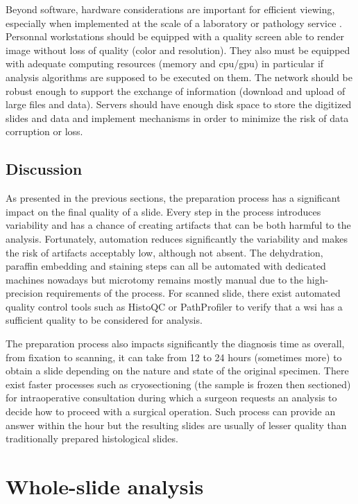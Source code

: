 Beyond software, hardware considerations are important for efficient viewing, especially when implemented at the scale of a laboratory or pathology service \cite{temprana2022digipatics}. Personnal workstations should be equipped with a quality screen able to render image without loss of quality (color and resolution). They also must be equipped with adequate computing resources (memory and \acrshort{cpu}/\acrshort{gpu}) in particular if analysis algorithms are supposed to be executed on them. The network should be robust enough to support the exchange of information (\ie download and upload of large files and data). Servers should have enough disk space to store the digitized slides and data and implement mechanisms in order to minimize the risk of data corruption or loss. 

\subsection{Discussion}

As presented in the previous sections, the preparation process has a significant impact on the final quality of a slide. Every step in the process introduces variability and has a chance of creating artifacts that can be both harmful to the analysis. Fortunately, automation reduces significantly the variability and makes the risk of artifacts acceptably low, although not absent. The dehydration, paraffin embedding and staining steps can all be automated with dedicated machines nowadays but microtomy remains mostly manual due to the high-precision requirements of the process. For scanned slide, there exist automated quality control tools such as HistoQC \cite{janowczyk2019histoqc} or PathProfiler \cite{haghighat2021pathprofiler} to verify that a \acrshort{wsi} has a sufficient quality to be considered for analysis. 

The preparation process also impacts significantly the diagnosis time as overall, from fixation to scanning, it can take from 12 to 24 hours (sometimes more) to obtain a slide depending on the nature and state of the original specimen. There exist faster processes such as cryosectioning (\ie the sample is frozen then sectioned) for intraoperative consultation during which a surgeon requests an analysis to decide how to proceed with a surgical operation. Such process can provide an answer within the hour but the resulting slides are usually of lesser quality than traditionally prepared histological slides.

\section{Whole-slide analysis}
\label{sec:backdp:typicalanalysistasks}

